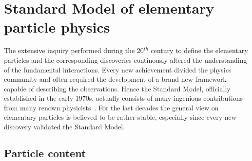 \section{Standard Model of elementary particle physics} \label{sec::SM}
The extensive inquiry performed during the 20$^{th}$ century to define the elementary particles and the corresponding discoveries continously altered the understanding of the fundamental interactions.
Every new achievement divided the physics community and often required the development of a brand new framework capable of describing the observations.
Hence the Standard Model, officially established in the early 1970s, actually consists of many ingenious contributions from many renown physicists~\cite{MandlAndShaw, PeskinAndSchroeder, Paschos:2007pi}. 
For the last decades the general view on elementary particles is believed to be rather stable, especially since every new discovery validated the Standard Model.

\subsection{Particle content}

